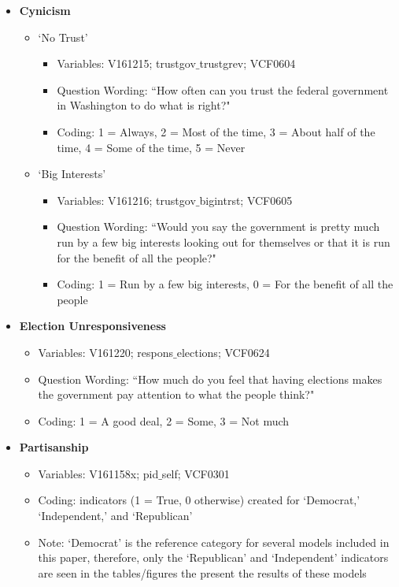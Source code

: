 \documentclass[12pt]{article}
\begin{document}
\begin{appendices}
\begin{refsection}
\begin{itemize}
	
	\item \textbf{Cynicism}
	\begin{itemize}
		\item `No Trust'
		\begin{itemize}
			\item Variables: V161215; trustgov$\_$trustgrev; VCF0604
			\item Question Wording: ``How often can you trust the federal government in Washington to do what is right?"
			\item Coding: 1 = Always, 2 = Most of the time, 3 = About half of the time, 4 = Some of the time, 5 = Never
		\end{itemize}
		\item `Big Interests'	
		\begin{itemize}
			\item Variables: V161216; trustgov$\_$bigintrst; VCF0605
			\item Question Wording: ``Would you say the government is pretty much run by a few big interests looking out for themselves or that it is run for the benefit of all the people?"
			\item Coding: 1 = Run by a few big interests, 0 = For the benefit of all the people
		\end{itemize}
	\end{itemize}
	
	\item \textbf{Election Unresponsiveness}
	\begin{itemize}
		\item Variables: V161220; respons$\_$elections; VCF0624
		\item Question Wording: ``How much do you feel that having elections makes the government pay attention to what the people think?"
		\item Coding: 1 = A good deal, 2 = Some, 3 = Not much
	\end{itemize}
	
	\item \textbf{Partisanship}
	\begin{itemize}
		\item Variables: V161158x; pid$\_$self; VCF0301
		\item Coding: indicators (1 = True, 0 otherwise) created for `Democrat,' `Independent,' and `Republican'
		\item Note: `Democrat' is the reference category for several models included in this paper, therefore, only the `Republican' and `Independent' indicators are seen in the tables/figures the present the results of these models
	\end{itemize}
	

\end{itemize}
\end{refsection}
\end{appendices}
\end{document}
